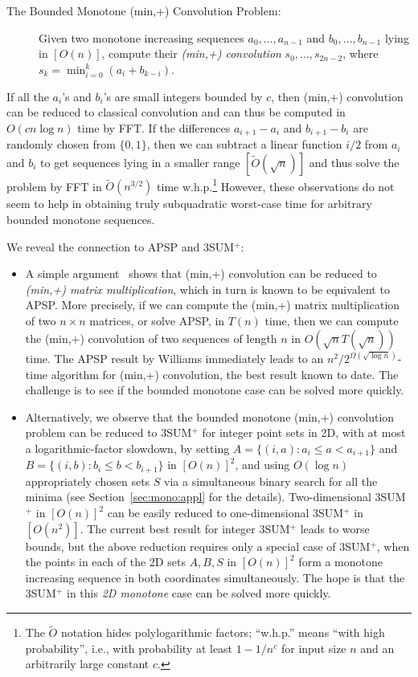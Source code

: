 \documentclass[11pt]{article}
\newcommand{\OO}{\widetilde{O}}
\begin{document}
\begin{description}
\item[The Bounded Monotone (min,+) Convolution Problem:]
Given two monotone increasing sequences $a_0,\ldots,a_{n-1}$ and $b_0,\ldots,b_{n-1}$ lying in $[O(n)]$, compute their \emph{(min,+)
convolution} $s_0,\ldots,s_{2n-2}$, where
$s_k = \min_{i=0}^k (a_i+b_{k-i})$.
\end{description}

If all the $a_i$'s and $b_i$'s are small integers bounded by $c$, then (min,+) convolution can be reduced to classical convolution and can
thus be computed in $O(cn\log n)$ time by FFT\@.
If the differences $a_{i+1}-a_i$ and $b_{i+1}-b_i$ are randomly
chosen from $\{0,1\}$, then we can subtract a linear function $i/2$
from $a_i$ and $b_i$ to get sequences lying in a smaller
range $[\OO(\sqrt{n})]$
and thus solve the problem by FFT in $\OO(n^{3/2})$ time w.h.p.\footnote{
The $\OO$ notation hides polylogarithmic factors;
``w.h.p.'' means ``with high probability'', i.e., with probability
at least $1-1/n^c$ for input size $n$ and an arbitrarily large
constant $c$.
}
However, these observations do not seem to help in obtaining truly subquadratic worst-case time
for arbitrary bounded monotone sequences.

We reveal the connection to APSP and 3SUM$^+$:
\begin{itemize}
\item
A simple argument~\cite{BCDEHILPT14} shows that
(min,+) convolution can be reduced to
\emph{(min,+) matrix multiplication}, which in turn is known to
be equivalent to APSP\@.  More precisely, if we can
compute the (min,+) matrix multiplication of two $n\times n$ matrices, or solve APSP, in $T(n)$ time, then we can compute the (min,+) convolution of two sequences of length $n$ in $O(\sqrt{n}T(\sqrt{n}))$ time.  The APSP result by Williams immediately leads to an ${n^2 / 2^{\Omega(\sqrt{\log n})}}$-time algorithm for (min,+) convolution, the best result known
to date.  The challenge is to see if the bounded monotone case
can be solved more quickly.
\item
Alternatively, we observe that the bounded monotone (min,+) convolution problem can be reduced to 3SUM$^+$
for integer point sets in 2D, with at most a logarithmic-factor
slowdown, by setting
$A=\{(i,a): a_i\le a < a_{i+1}\}$ and
$B=\{(i,b): b_i\le b < b_{i+1}\}$ in $[O(n)]^2$, and
using $O(\log n)$ appropriately chosen sets $S$ via
a simultaneous binary search for all the minima (see Section~\ref{sec:mono:appl} for the
details).
Two-dimensional 3SUM$^+$ in $[O(n)]^2$ can be easily
reduced to one-dimensional 3SUM$^+$ in $[O(n^2)]$.
The current best result for integer 3SUM$^+$
leads to worse bounds, but the above reduction requires only
a special case of 3SUM$^+$, when the points in each of the 2D sets
$A,B,S$ in $[O(n)]^2$ form a monotone increasing sequence in both
coordinates simultaneously.  The hope is that the 3SUM$^+$
in this \emph{2D monotone} case can be solved more quickly.
\end{itemize}
\end{document}
